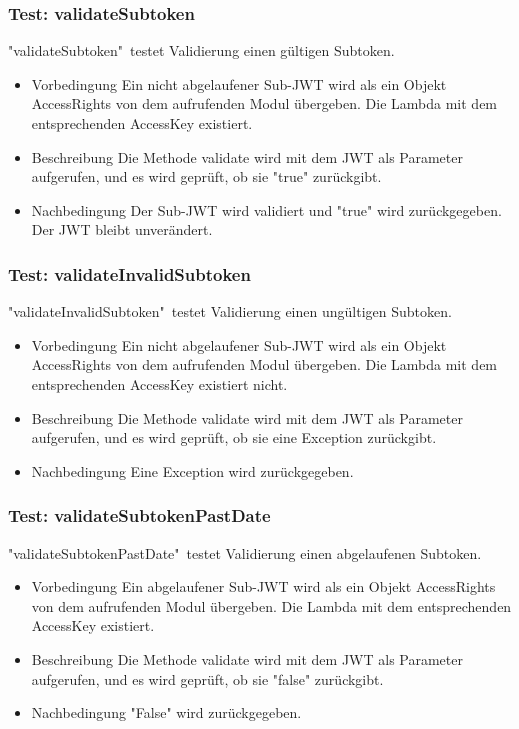 \documentclass[a4paper,20pt,oneside]{book}
\begin{document}
\subsubsection{Test: validateSubtoken}
"validateSubtoken"\ testet Validierung einen gültigen Subtoken.

\begin{itemize}
\item Vorbedingung\linebreak
Ein nicht abgelaufener Sub-JWT wird als ein Objekt AccessRights von dem aufrufenden Modul übergeben. Die Lambda mit dem entsprechenden AccessKey existiert.
\item Beschreibung\linebreak
Die Methode validate wird mit dem JWT als Parameter aufgerufen, und es wird geprüft, ob sie "true" zurückgibt.
\item Nachbedingung\linebreak
Der  Sub-JWT wird validiert und "true" wird zurückgegeben. Der JWT bleibt unverändert.
\end{itemize}
\subsubsection{Test: validateInvalidSubtoken}
"validateInvalidSubtoken"\ testet Validierung einen ungültigen Subtoken.

\begin{itemize}
\item Vorbedingung\linebreak
Ein nicht abgelaufener Sub-JWT wird als ein Objekt AccessRights von dem aufrufenden Modul übergeben. Die Lambda mit dem entsprechenden AccessKey existiert nicht.
\item Beschreibung\linebreak
Die Methode validate wird mit dem JWT als Parameter aufgerufen, und es wird geprüft, ob sie eine Exception zurückgibt.
\item Nachbedingung\linebreak
Eine Exception wird zurückgegeben.
\end{itemize}
\subsubsection{Test: validateSubtokenPastDate}
"validateSubtokenPastDate"\ testet Validierung einen abgelaufenen Subtoken.
\begin{itemize}
\item Vorbedingung\linebreak
Ein abgelaufener Sub-JWT wird als ein Objekt AccessRights von dem aufrufenden Modul übergeben. Die Lambda mit dem entsprechenden AccessKey existiert.
\item Beschreibung\linebreak
Die Methode validate wird mit dem JWT als Parameter aufgerufen, und es wird geprüft, ob sie "false" zurückgibt.
\item Nachbedingung\linebreak
"False" wird zurückgegeben.
\end{itemize}
\end{document}
